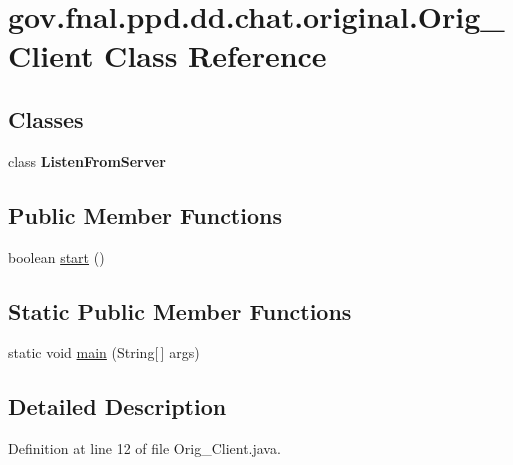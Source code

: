\hypertarget{classgov_1_1fnal_1_1ppd_1_1dd_1_1chat_1_1original_1_1Orig__Client}{\section{gov.\-fnal.\-ppd.\-dd.\-chat.\-original.\-Orig\-\_\-\-Client Class Reference}
\label{classgov_1_1fnal_1_1ppd_1_1dd_1_1chat_1_1original_1_1Orig__Client}
}
\subsection*{Classes}
\begin{DoxyCompactItemize}
\item 
class {\bfseries Listen\-From\-Server}
\end{DoxyCompactItemize}
\subsection*{Public Member Functions}
\begin{DoxyCompactItemize}
\item 
boolean \hyperlink{classgov_1_1fnal_1_1ppd_1_1dd_1_1chat_1_1original_1_1Orig__Client_adf63b9f86aaf9b4bf5387b1a5b12a1f1}{start} ()
\end{DoxyCompactItemize}
\subsection*{Static Public Member Functions}
\begin{DoxyCompactItemize}
\item 
static void \hyperlink{classgov_1_1fnal_1_1ppd_1_1dd_1_1chat_1_1original_1_1Orig__Client_a72c41e526aaa03314dd5bba2d5d51a5e}{main} (String\mbox{[}$\,$\mbox{]} args)
\end{DoxyCompactItemize}


\subsection{Detailed Description}


Definition at line 12 of file Orig\-\_\-\-Client.\-java.



